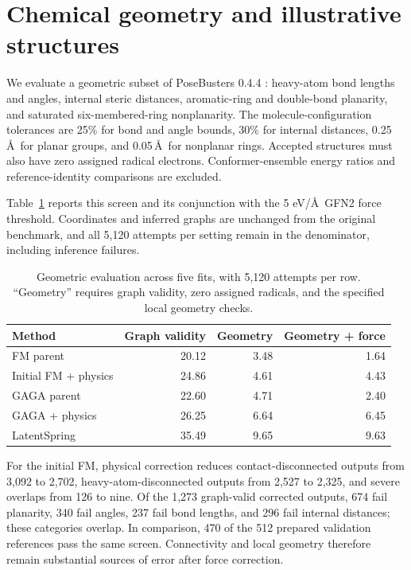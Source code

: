 \section{Chemical geometry and illustrative structures}\label{app:chemical-geometry}
We evaluate a geometric subset of PoseBusters 0.4.4 \citep{buttenschoen2024posebusters}: heavy-atom bond lengths and angles, internal steric distances, aromatic-ring and double-bond planarity, and saturated six-membered-ring nonplanarity. The molecule-configuration tolerances are 25\% for bond and angle bounds, 30\% for internal distances, 0.25\,\AA\ for planar groups, and 0.05\,\AA\ for nonplanar rings. Accepted structures must also have zero assigned radical electrons. Conformer-ensemble energy ratios and reference-identity comparisons are excluded.

Table~\ref{tab:chemical-geometry} reports this screen and its conjunction with the 5 eV/\AA\ GFN2 force threshold. Coordinates and inferred graphs are unchanged from the original benchmark, and all 5,120 attempts per setting remain in the denominator, including inference failures.

\begin{table}[htbp]\centering\small
\caption{Geometric evaluation across five fits, with 5,120 attempts per row. ``Geometry'' requires graph validity, zero assigned radicals, and the specified local geometry checks.}
\begin{tabular}{lrrr}\toprule
Method & Graph validity & Geometry & Geometry + force\\\midrule
FM parent &20.12&3.48&1.64\\
Initial FM + physics &24.86&4.61&4.43\\
GAGA parent &22.60&4.71&2.40\\
GAGA + physics &26.25&6.64&6.45\\
LatentSpring &35.49&9.65&9.63\\
\bottomrule\end{tabular}\label{tab:chemical-geometry}
\end{table}

For the initial FM, physical correction reduces contact-disconnected outputs from 3,092 to 2,702, heavy-atom-disconnected outputs from 2,527 to 2,325, and severe overlaps from 126 to nine. Of the 1,273 graph-valid corrected outputs, 674 fail planarity, 340 fail angles, 237 fail bond lengths, and 296 fail internal distances; these categories overlap. In comparison, 470 of the 512 prepared validation references pass the same screen. Connectivity and local geometry therefore remain substantial sources of error after force correction.

